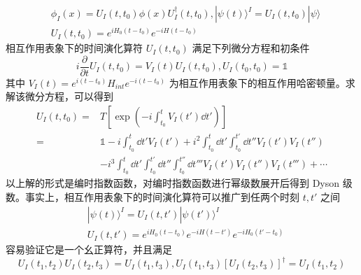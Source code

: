 \begin{equation}
\begin{aligned}
&\phi_I(x)=U_I(t,t_0)\phi(x)U_I^\dagger(t,t_0),|\psi(t)\rangle^I=U_I(t,t_0)|\psi\rangle\\ 
&U_I(t,t_0)=e^{iH_0(t-t_0)}e^{-iH(t-t_0)}
\end{aligned}
\end{equation}
相互作用表象下的时间演化算符 $U_I(t,t_0)$ 满足下列微分方程和初条件
\begin{equation}
i\frac{\partial}{\partial t}U_I(t,t_0)=V_I(t)U_I(t,t_0), U_I(t_0,t_0)=\mathbb{1}
\end{equation}
其中 $V_I(t)=e^{i(t-t_0)}H_{int} e^{-i(t-t_0)}$ 为相互作用表象下的相互作用哈密顿量。求解该微分方程，可以得到
\begin{equation}
\begin{aligned}
U_I(t,t_0)=&T\left[\exp\left(-i\int_{t_0}^{t}V_I(t')\dd t'\right)\right]\\
=&\mathbb{1}-i\int_{t_0}^t \dd t' V_I(t')+i^2\int_{t_0}^t \dd t'  \int_{t_0}^{t'} \dd t'' V_I(t')V_I(t'') \\
 &-i^3\int_{t_0}^t \dd t'  \int_{t_0}^{t'} \dd t'' \int_{t_0}^{t''}\dd t''' V_I(t')V_I(t'')V_I(t''')+\cdots
\end{aligned}
\end{equation}
以上解的形式是编时指数函数，对编时指数函数进行幂级数展开后得到 Dyson 级数。事实上，相互作用表象下的时间演化算符可以推广到任两个时刻 $t,t'$ 之间
\begin{equation}\label{eq_Ipic_1}
\begin{aligned}
& |\psi(t)\rangle^I=U_I(t,t')|\psi(t')\rangle^I\\
& U_I(t,t')=e^{iH_0(t-t_0)}e^{-iH(t-t')}e^{-iH_0(t'-t_0)}
\end{aligned}
\end{equation}
容易验证它是一个幺正算符，并且满足
\begin{equation}
U_I(t_1,t_2)U_I(t_2,t_3)=U_I(t_1,t_3), U_I(t_1,t_3)[U_I(t_2,t_3)]^\dagger=U_I(t_1,t_2)
\end{equation}


